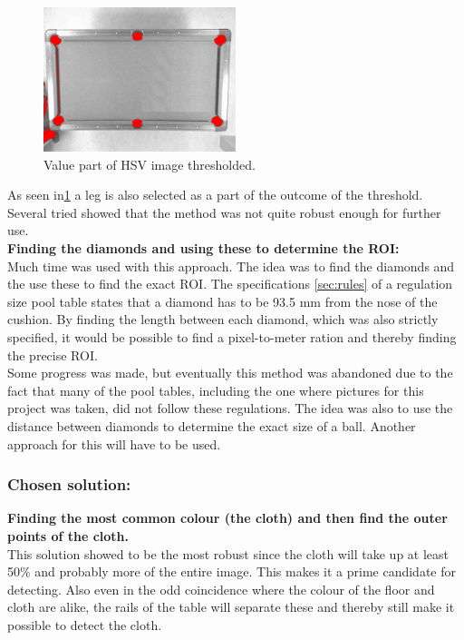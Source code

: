 \begin{figure}[H]
\begin{center}
\leavevmode
\includegraphics[width=0.5\textwidth]{images/value_thres}
\end{center}
\caption{Value part of HSV image thresholded.}
\label{fig:value_thres}
\end{figure}

As seen in\ref{fig:value_thres} a leg is also selected as a part of the outcome of the threshold. Several tried showed that the method was not quite robust enough for further use.\\

\textbf{Finding the diamonds and using these to determine the ROI:}\\
Much time was used with this approach. The idea was to find the diamonds and the use these to find the exact ROI. The specifications \ref{sec:rules} of a regulation size pool table states that a diamond has to be 93.5 mm from the nose of the cushion. By finding the length between each diamond, which was also strictly specified, it would be possible to find a pixel-to-meter ration and thereby finding the precise ROI.\\

Some progress was made, but eventually this method was abandoned due to the fact that many of the pool tables, including the one where pictures for this  project was taken, did not follow these regulations. The idea was also to use the distance between diamonds to determine the exact size of a ball. Another approach for this will have to be used.\\

\subsubsection{Chosen solution:}

\textbf{Finding the most common colour (the cloth) and then find the outer points of the cloth.}\\
This solution showed to be the most robust since the cloth will take up at least 50\% and probably more of the entire image. This makes it a prime candidate for detecting. Also even in the odd coincidence where the colour of the floor and cloth are alike, the rails of the table will separate these and thereby still make it possible to detect the cloth.\\

